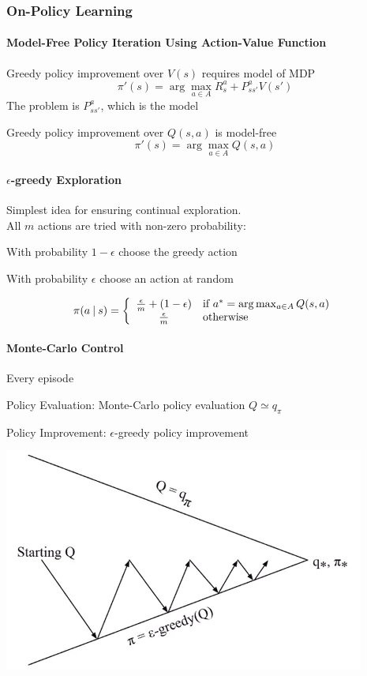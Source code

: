 \documentclass[10pt]{report}
\begin{document}
\subsubsection{On-Policy Learning}
\paragraph{Model-Free Policy Iteration Using Action-Value Function}
\begin{list}{}{}
	\item Greedy policy improvement over $V(s)$ requires model of MDP
	$$\pi'(s) = \arg\max_{a\in A}R_s^a + P_{ss'}^aV(s')$$
	The problem is $P_{ss'}^a$, which is the model
	\item Greedy policy improvement over $Q(s,a)$ is model-free
	$$\pi'(s) = \arg\max_{a\in A}Q(s,a)$$
\end{list}
\paragraph{$\epsilon$-greedy Exploration} Simplest idea for ensuring continual exploration.\\
All $m$ actions are tried with non-zero probability:\begin{list}{}{}
	\item With probability $1-\epsilon$ choose the greedy action
	\item With probability $\epsilon$ choose an action at random
\end{list}
$$\pi(a\:|\:s)= \left\{\begin{array}{c l}
\frac{\epsilon}{m}+(1-\epsilon)&\text{if }a^*=\arg\max_{a\in A}Q(s,a)\\
\frac{\epsilon}{m}&\text{otherwise}
\end{array}\right.$$
\paragraph{Monte-Carlo Control} Every episode
\begin{list}{}{}
	\item Policy Evaluation: Monte-Carlo policy evaluation $Q\simeq q_\pi$
	\item Policy Improvement: $\epsilon$-greedy policy improvement
\end{list}
\begin{center}
	\includegraphics[scale=0.5]{172.png}
\end{center}
\end{document}
